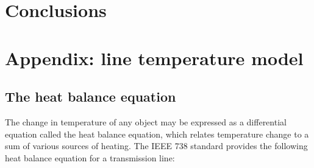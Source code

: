 \documentclass[conference]{IEEEtran}
\begin{document}


\section{Conclusions}


\section{Appendix: line temperature model}\label{sec:temp}

\subsection{The heat balance equation}

The change in temperature of any object may be expressed as a differential equation called the heat balance equation, which relates temperature change to a sum of various sources of heating. The IEEE 738 standard \cite{ieee2013} provides the following heat balance equation for a transmission line:
\end{document}
